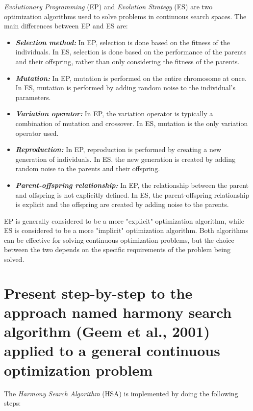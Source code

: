 \documentclass[conference]{IEEEtran}
\begin{document}
\textit{Evolutionary Programming }(EP) and \textit{Evolution Strategy} (ES) are two optimization algorithms used to solve problems in continuous search spaces. The main differences between EP and ES are:

\begin{itemize}
	\item \textbf{\textit{Selection method:}} In EP, selection is done based on the fitness of the individuals. In ES, selection is done based on the performance of the parents and their offspring, rather than only considering the fitness of the parents.
	
	\item \textbf{\textit{Mutation:}} In EP, mutation is performed on the entire chromosome at once. In ES, mutation is performed by adding random noise to the individual's parameters.
	
	\item \textbf{\textit{Variation operator:}} In EP, the variation operator is typically a combination of mutation and crossover. In ES, mutation is the only variation operator used.
	
	\item \textbf{\textit{Reproduction:}} In EP, reproduction is performed by creating a new generation of individuals. In ES, the new generation is created by adding random noise to the parents and their offspring.
	
	\item \textbf{\textit{Parent-offspring relationship:}} In EP, the relationship between the parent and offspring is not explicitly defined. In ES, the parent-offspring relationship is explicit and the offspring are created by adding noise to the parents.
\end{itemize}

EP is generally considered to be a more "explicit" optimization algorithm, while ES is considered to be a more "implicit" optimization algorithm. Both algorithms can be effective for solving continuous optimization problems, but the choice between the two depends on the specific requirements of the problem being solved.

\section{Present step-by-step to the approach named harmony search algorithm (Geem et al., 2001) applied to a general continuous optimization problem}

The \textit{Harmony Search Algorithm} (HSA) is implemented by doing the following steps:
\end{document}
